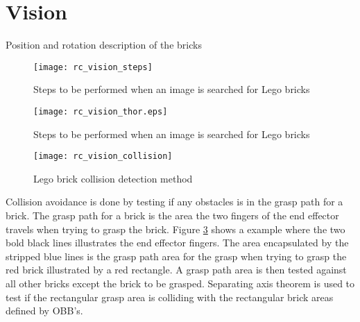 \section{Vision}
\label{sec:rc_hmi_sec}
Position and rotation description of the bricks \\


	\begin{figure}[H]
		\centering
	    \texttt{[image: rc\_vision\_steps]}
	    \caption{Steps to be performed when an image is searched for Lego bricks}
		\label{fig:rc_vision_steps}
	\end{figure}
	
	\begin{figure}[H]
		\centering
	    \texttt{[image: rc\_vision\_thor.eps]}
	    \caption{Steps to be performed when an image is searched for Lego bricks}
		\label{fig:rc_vision_steps_thor}
	\end{figure}
	
	\begin{figure}[H]
		\centering
	    \texttt{[image: rc\_vision\_collision]}
	    \caption{Lego brick collision detection method}
		\label{fig:rc_vision_collision}
	\end{figure}
	
Collision avoidance is done by testing if any obstacles is in the grasp path for a brick. The grasp path for a brick is the area the two fingers of the end effector travels when trying to grasp the brick. Figure \ref{fig:rc_vision_collision} shows a example where the two bold black lines illustrates the end effector fingers. The area encapsulated by the stripped blue lines is the grasp path area for the grasp when trying to grasp the red brick illustrated by a red rectangle. A grasp path area is then tested against all other bricks except the brick to be grasped. Separating axis theorem\cite{Gottschalk:1996:OHS:237170.237244} is used to test if the rectangular grasp area is colliding with the rectangular brick areas defined by OBB's.